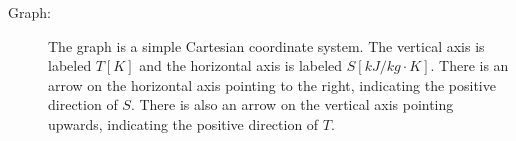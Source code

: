 

\item[a)] 
    \begin{description}
        \item[Graph:] The graph is a simple Cartesian coordinate system. The vertical axis is labeled \( T [K] \) and the horizontal axis is labeled \( S [kJ / {kg \cdot K}] \). There is an arrow on the horizontal axis pointing to the right, indicating the positive direction of \( S \). There is also an arrow on the vertical axis pointing upwards, indicating the positive direction of \( T \).
    \end{description}